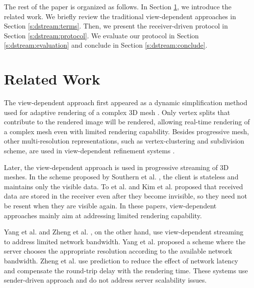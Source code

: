 
    The rest of the paper is organized as follows.
    In Section \ref{s:dstream:related}, we introduce the related work. We briefly  
    review the traditional view-dependent approaches in Section \ref{s:dstream:terms}. 
    Then, we present the receiver-driven protocol 
    in Section \ref{s:dstream:protocol}.
    We evaluate our protocol in Section \ref{s:dstream:evaluation} 
    and conclude in Section \ref{s:dstream:conclude}.
\section{Related Work}
\label{s:dstream:related}
    The view-dependent approach first appeared as 
    a dynamic simplification method used for adaptive rendering of a complex 3D mesh
    \cite{258843, 258847}. Only vertex splits that contribute to the rendered
    image will be rendered, allowing real-time rendering of a complex mesh
    even with limited rendering capability.
    Besides progressive mesh, other multi-resolution representations, 
    such as vertex-clustering  and subdivision scheme,
    are used in view-dependent refinement systems \cite{245627, efficient:Alliez,602344}.

    Later, the view-dependent approach is used in progressive 
	streaming of 3D meshes.     In the scheme proposed by Southern et al. \cite{363375},  the client is stateless and
    maintains only the visible data. 
    To et al. \cite{To1999}
    and Kim et al. \cite{kim:view} proposed that received data are stored
    in the receiver even after they become invisible, 
    so they need not be resent when they are visible again. 
    In these papers, view-dependent approaches mainly aim at addressing
    limited rendering capability. 
    
    Yang et al. \cite{progressive:Yang} and
     Zheng et al. \cite{zheng:interactive}, on the other hand, use
     view-dependent streaming to address limited network bandwidth.
     Yang et al. proposed a scheme where the server chooses the appropriate resolution
     according to the available network bandwidth.
     Zheng et al. \cite{zheng:interactive} use prediction to
     reduce the effect of network latency and 
     compensate the round-trip delay with the rendering time.
     These systems use sender-driven approach and do not address
     server scalability issues.


